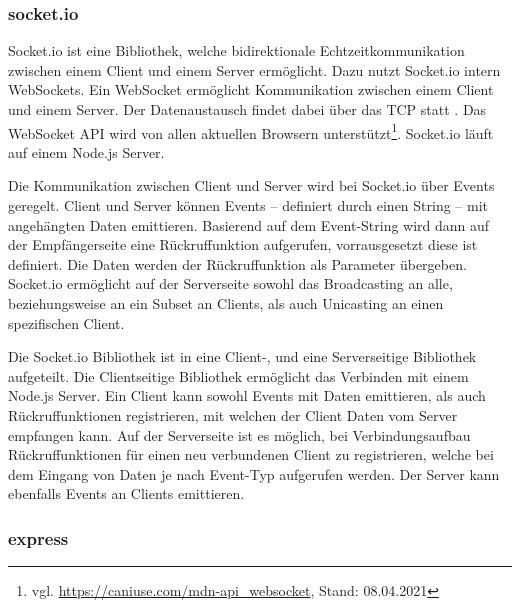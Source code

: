 \subsubsection{socket.io}
Socket.io ist eine Bibliothek, welche bidirektionale Echtzeitkommunikation zwischen einem Client und einem Server ermöglicht. Dazu nutzt Socket.io intern WebSockets\cite{socketio}. Ein WebSocket ermöglicht Kommunikation zwischen einem Client und einem Server. Der Datenaustausch findet dabei über das \ac{TCP} statt \cite{websocketRFC}. Das WebSocket \ac{API} wird von allen aktuellen Browsern unterstützt\footnote{vgl. \url{https://caniuse.com/mdn-api_websocket}, Stand: 08.04.2021}. Socket.io läuft auf einem Node.js Server\cite{socketio}.\par

Die Kommunikation zwischen Client und Server wird bei Socket.io über Events geregelt. Client und Server können Events -- definiert durch einen String -- mit angehängten Daten emittieren. Basierend auf dem Event-String wird dann auf der Empfängerseite eine Rückruffunktion aufgerufen, vorrausgesetzt diese ist definiert. Die Daten werden der Rückruffunktion als Parameter übergeben. Socket.io ermöglicht auf der Serverseite sowohl das Broadcasting an alle, beziehungsweise an ein Subset an Clients, als auch Unicasting an einen spezifischen Client.\par

Die Socket.io Bibliothek ist in eine Client-, und eine Serverseitige Bibliothek aufgeteilt. Die Clientseitige Bibliothek ermöglicht das Verbinden mit einem Node.js Server. Ein Client kann sowohl Events mit Daten emittieren, als auch Rückruffunktionen registrieren, mit welchen der Client Daten vom Server empfangen kann. Auf der Serverseite ist es möglich, bei Verbindungsaufbau Rückruffunktionen für einen neu verbundenen Client zu registrieren, welche bei dem Eingang von Daten je nach Event-Typ aufgerufen werden. Der Server kann ebenfalls Events an Clients emittieren.

\subsubsection{express}